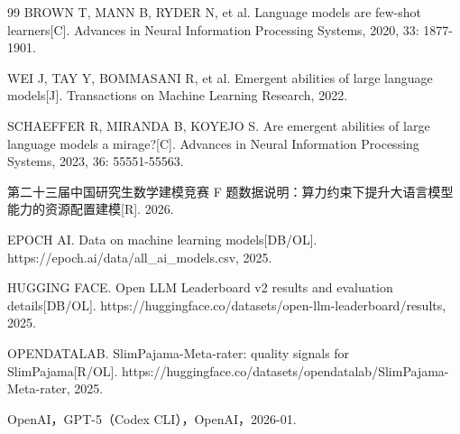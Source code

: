 \begin{thebibliography}{99}
 BROWN T, MANN B, RYDER N, et al. Language models are few-shot learners[C]. Advances in Neural Information Processing Systems, 2020, 33: 1877-1901.

 WEI J, TAY Y, BOMMASANI R, et al. Emergent abilities of large language models[J]. Transactions on Machine Learning Research, 2022.

 SCHAEFFER R, MIRANDA B, KOYEJO S. Are emergent abilities of large language models a mirage?[C]. Advances in Neural Information Processing Systems, 2023, 36: 55551-55563.

 第二十三届中国研究生数学建模竞赛 F 题数据说明：算力约束下提升大语言模型能力的资源配置建模[R]. 2026.

 EPOCH AI. Data on machine learning models[DB/OL]. https://epoch.ai/data/all\_ai\_models.csv, 2025.

 HUGGING FACE. Open LLM Leaderboard v2 results and evaluation details[DB/OL]. https://huggingface.co/datasets/open-llm-leaderboard/results, 2025.

 OPENDATALAB. SlimPajama-Meta-rater: quality signals for SlimPajama[R/OL]. https://huggingface.co/datasets/opendatalab/SlimPajama-Meta-rater, 2025.

 OpenAI，GPT-5（Codex CLI），OpenAI，2026-01.

\end{thebibliography}
